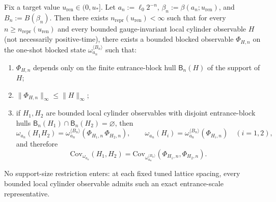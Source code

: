 \begin{proposition}
\label{prop:route1_blocked_representatives}
Fix a target value $u_{\mathrm{ren}}\in(0,u_\ast]$.
Let $a_n:=\ell_0 2^{-n}$, $\beta_n:=\beta(a_n;u_{\mathrm{ren}})$, and $B_n:=B(\beta_n)$.
Then there exists $n_{\mathrm{repr}}(u_{\mathrm{ren}})<\infty$ such that for every $n\ge n_{\mathrm{repr}}(u_{\mathrm{ren}})$ and every bounded gauge-invariant local cylinder observable $H$ (not necessarily positive-time), there exists a bounded blocked observable $\Phi_{H,n}$ on the one-shot blocked state $\omega_{a_n}^{\langle B_n\rangle}$ such that:
\begin{enumerate}[leftmargin=*]
\item $\Phi_{H,n}$ depends only on the finite entrance-block hull $\mathsf B_n(H)$ of the support of $H$;
\item $\|\Phi_{H,n}\|_\infty\le \|H\|_\infty$;
\item if $H_1,H_2$ are bounded local cylinder observables with disjoint entrance-block hulls $\mathsf B_n(H_1)\cap \mathsf B_n(H_2)=\varnothing$, then
\begin{equation}\label{eq:route1_exact_core_cov_identity}
\omega_{a_n}(H_1H_2)
=
\omega_{a_n}^{\langle B_n\rangle}(\Phi_{H_1,n}\,\Phi_{H_2,n}),
\qquad
\omega_{a_n}(H_i)=\omega_{a_n}^{\langle B_n\rangle}(\Phi_{H_i,n})\quad(i=1,2),
\end{equation}
and therefore
\begin{equation}\label{eq:route1_exact_core_covariance}
\mathrm{Cov}_{\omega_{a_n}}(H_1,H_2)
=
\mathrm{Cov}_{\omega_{a_n}^{\langle B_n\rangle}}(\Phi_{H_1,n},\Phi_{H_2,n}).
\end{equation}
\end{enumerate}
No support-size restriction enters: at each fixed tuned lattice spacing, every bounded local cylinder observable admits such an exact entrance-scale representative.
\end{proposition}

